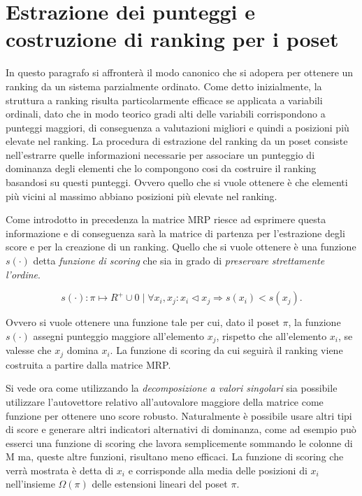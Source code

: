 \documentclass{report}
\begin{document}
\chapter{Estrazione dei punteggi e costruzione di ranking per i poset}
In questo paragrafo si affronterà il modo canonico che si adopera per ottenere un ranking da un sistema parzialmente ordinato. Come detto inizialmente, la struttura a ranking risulta particolarmente efficace se applicata a variabili ordinali, dato che in modo teorico gradi alti delle variabili corrispondono a punteggi maggiori, di conseguenza a valutazioni migliori e quindi a posizioni più elevate nel ranking. La procedura di estrazione del ranking da un poset consiste nell'estrarre quelle informazioni necessarie per associare un punteggio di dominanza degli elementi che lo compongono cosi da costruire il ranking basandosi su questi punteggi. Ovvero quello che si vuole ottenere è che elementi più vicini al massimo abbiano posizioni più elevate nel ranking.


Come introdotto in precedenza la matrice MRP riesce ad esprimere questa informazione e di conseguenza sarà la matrice di partenza per l'estrazione degli score e per la creazione di un ranking.
Quello che si vuole ottenere è una funzione $s(\cdot)$ detta \textit{funzione di scoring} che sia in grado di \textit{preservare strettamente l'ordine}.

\[s(\cdot): \pi \mapsto R^{+} \cup 0 \;|\; \forall x_i,x_j : x_i \lhd x_j \Rightarrow s(x_i) < s(x_j).\]

Ovvero si vuole ottenere una funzione tale per cui, dato il poset $\pi$, la funzione $s(\cdot)$ assegni punteggio maggiore all'elemento $x_j$, rispetto che all'elemento $x_i$, se valesse che $x_j$ domina $x_i$. La funzione di scoring da cui seguirà il ranking viene costruita a partire dalla matrice MRP.


Si vede ora come utilizzando la \textit{decomposizione a valori singolari} sia possibile utilizzare l'autovettore relativo all'autovalore maggiore della matrice come funzione per ottenere uno score robusto.  Naturalmente è possibile usare altri tipi di score e generare altri indicatori alternativi di dominanza, come ad esempio può esserci una funzione di scoring che lavora semplicemente sommando le colonne di M ma, queste altre funzioni, risultano meno efficaci. La funzione di scoring che verrà mostrata è detta  di $x_i$ e corrisponde alla media delle posizioni di $x_i$ nell'insieme $\Omega(\pi)$ delle estensioni lineari del poset $\pi$.
\end{document}
